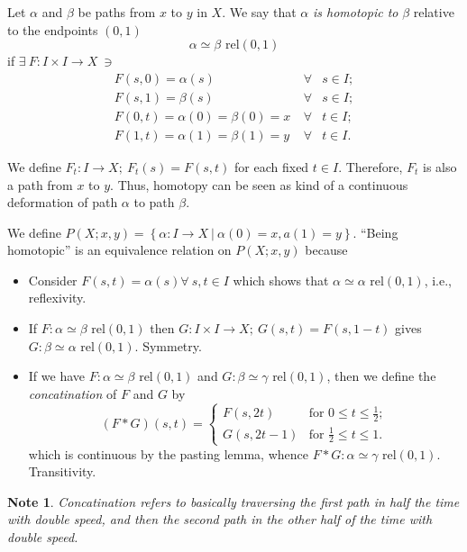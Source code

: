 \documentclass[a4paper,11pt]{article}
\newcommand{\lb}{\left(}
\newcommand{\rb}{\right)}
\newcommand{\lc}{\left\lbrace}
\newcommand{\rc}{\right\rbrace}
\newcommand{\g}{\gamma}
\renewcommand{\a}{\alpha}
\renewcommand{\b}{\beta}
\newcommand{\rel}{\text{ rel}}
\newcommand{\tends}{\rightarrow}
\newtheorem{note}[thm]{Note}
\begin{document}
Let $\a$ and $\b$ be paths from $x$ to $y$ in $X$. We say that $\a$ \emph{is homotopic to} $\b$ relative to the endpoints $(0,1)$
$$\a\simeq\b\rel(0,1)$$
if $\exists~F:I\times I\tends X~\ni$
\begin{eqnarray*}
  F(s,0)=\a(s)~&\forall&s\in I;\\
  F(s,1)=\b(s)~&\forall&s\in I;\\
  F(0,t)=\a(0)=\b(0)=x~&\forall&t\in I;\\
  F(1,t)=\a(1)=\b(1)=y~&\forall&t\in I.
\end{eqnarray*}

We define $F_t:I\tends X;~F_t(s)=F(s,t)$ for each fixed $t\in I$. Therefore, $F_t$ is also a path from $x$ to $y$. Thus, homotopy can be seen as kind of a continuous deformation of path $\a$ to path $\b$.

We define $P\lb X;x,y\rb=\lc\a:I\tends X~|~\a(0)=x,a(1)=y\rc$. ``Being homotopic'' is an equivalence relation on $P\lb X;x,y\rb$ because

\begin{itemize}
  \item[(i)]Consider $F(s,t)=\a(s)\forall~s,t\in I$ which shows that $\a\simeq\a \rel(0,1)$, i.e., reflexivity.
  \item[(ii)]If $F:\a\simeq\b\rel(0,1)$ then $G:I\times I\tends X;~G(s,t)=F(s,1-t)$ gives $G:\b\simeq\a\rel(0,1)$. Symmetry.
  \item[(iii)]If we have $F:\a\simeq\b\rel(0,1)$ and $G:\b\simeq\g\rel(0,1)$, then we define the \emph{concatination} of $F$ and $G$ by
  $$(F*G)(s,t)=\begin{cases}
    F(s,2t)&\text{for }0\leq t\leq\frac{1}{2};\\
    G(s,2t-1)&\text{for }\frac{1}{2}\leq t\leq 1.
  \end{cases}$$
  which is continuous by the pasting lemma, whence $F*G:\a\simeq\g\rel(0,1)$. Transitivity.
\end{itemize}

\begin{note}
Concatination refers to basically traversing the first path in half the time with double speed, and then the second path in the other half of the time with double speed.
\end{note}
\end{document}
